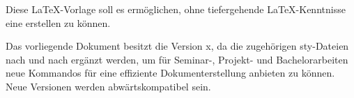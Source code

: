 Diese \LaTeX{}-Vorlage soll es erm\"oglichen, ohne tiefergehende \LaTeX-Kenntnisse 
eine \seArbeit{} erstellen zu k\"onnen.

Das vorliegende Dokument besitzt die Version x, da die zugeh\"origen sty-Dateien 
nach und nach erg\"anzt werden, um f\"ur Seminar-, Projekt- und Bachelorarbeiten neue 
Kommandos f\"ur eine effiziente Dokumenterstellung anbieten zu k\"onnen. 
Neue Versionen werden abw\"artskompatibel sein. 
